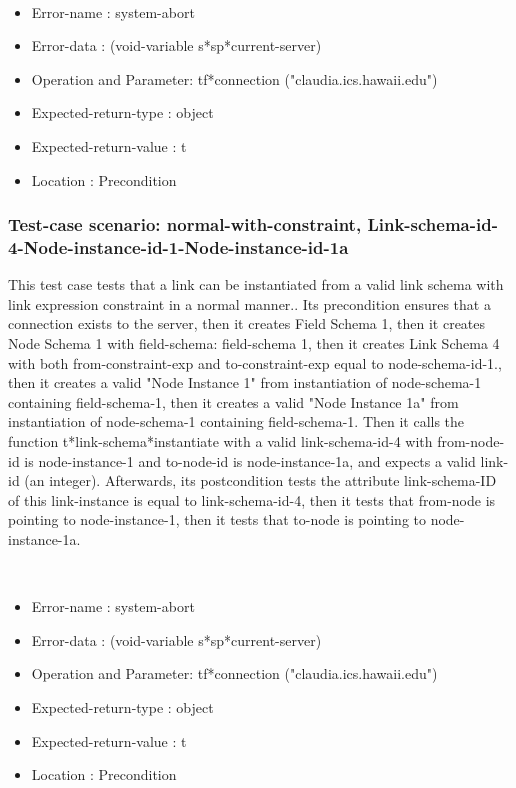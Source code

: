 \
\begin {itemize}
\item 	Error-name             : system-abort
\item Error-data             : (void-variable s*sp*current-server)
\item Operation and Parameter: tf*connection ("claudia.ics.hawaii.edu")
\item Expected-return-type   : object
\item Expected-return-value  : t
\item Location               : Precondition



\end {itemize}
\subsubsection {Test-case scenario: normal-with-constraint, Link-schema-id-4-Node-instance-id-1-Node-instance-id-1a}


This test case tests that a link can be instantiated from a valid link schema with link expression constraint in a normal manner..
Its precondition ensures that a connection exists to the server, then it creates Field Schema 1, then it creates Node Schema 1 with field-schema: field-schema 1, then it creates Link Schema 4 with both  from-constraint-exp and to-constraint-exp equal to node-schema-id-1., then it creates a valid "Node Instance 1" from instantiation of node-schema-1 containing field-schema-1, then it creates a valid "Node Instance 1a" from instantiation of node-schema-1 containing field-schema-1.
Then it calls the function t*link-schema*instantiate  with a valid link-schema-id-4 with from-node-id is node-instance-1 and to-node-id is node-instance-1a, and expects a valid link-id (an integer).
Afterwards, its postcondition tests the attribute link-schema-ID of this link-instance is equal to link-schema-id-4, then it tests that from-node is pointing to node-instance-1, then it tests that to-node is pointing to node-instance-1a.


\
\begin {itemize}
\item 	Error-name             : system-abort
\item Error-data             : (void-variable s*sp*current-server)
\item Operation and Parameter: tf*connection ("claudia.ics.hawaii.edu")
\item Expected-return-type   : object
\item Expected-return-value  : t
\item Location               : Precondition



\end {itemize}
